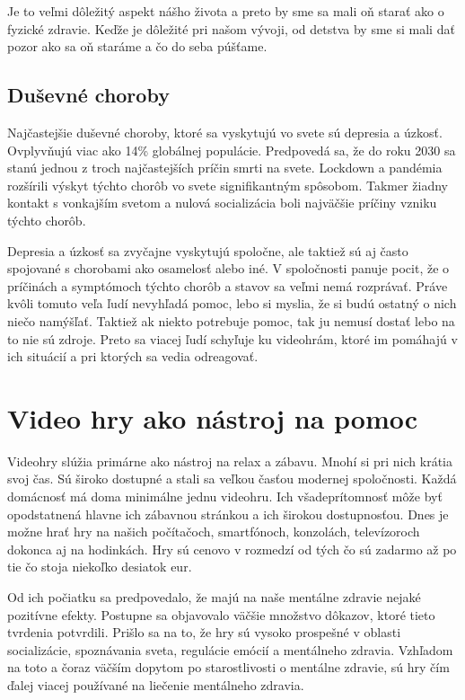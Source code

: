 \documentclass[10pt,oneside,slovak,a4paper]{article}
\begin{document}
Je to veľmi dôležitý aspekt nášho života a preto by sme sa mali oň starať ako o fyzické zdravie. Keďže je dôležité pri našom vývoji, od detstva by sme si mali dať pozor ako sa oň staráme a čo do seba púšťame. \cite{CDC}




\subsection{Duševné choroby} \label{Mentalne Zdravie- Choroby}

Najčastejšie duševné choroby, ktoré sa vyskytujú vo svete sú depresia a úzkosť.  Ovplyvňujú viac ako 14\% globálnej populácie. Predpovedá sa, že do roku 2030 sa stanú jednou z troch najčastejších príčin smrti na svete. Lockdown a pandémia rozšírili výskyt týchto chorôb vo svete signifikantným spôsobom. Takmer žiadny kontakt s vonkajším svetom a nulová socializácia boli najväčšie príčiny vzniku týchto chorôb. 

Depresia a úzkosť sa zvyčajne vyskytujú spoločne, ale taktiež sú aj často spojované s chorobami ako osamelosť alebo iné. V spoločnosti panuje pocit, že o príčinách a symptómoch týchto chorôb a stavov sa veľmi nemá rozprávať. Práve kvôli tomuto veľa ľudí nevyhľadá pomoc, lebo si myslia, že si budú ostatný o nich niečo namýšľať. Taktiež ak niekto potrebuje pomoc, tak ju nemusí dostať lebo na to nie sú zdroje. Preto sa viacej ľudí schyľuje ku videohrám, ktoré im pomáhajú v ich situácií a pri ktorých sa vedia odreagovať.\cite{Kowal:Mitigation}


\section{Video hry ako nástroj na pomoc} \label{Videohry}

Videohry slúžia primárne ako nástroj na relax a zábavu. Mnohí si pri nich krátia svoj čas. Sú široko dostupné a stali sa veľkou časťou modernej spoločnosti. Každá domácnosť má doma minimálne jednu videohru. Ich všadeprítomnosť môže byť opodstatnená hlavne ich zábavnou stránkou a ich širokou dostupnosťou. Dnes je možne hrať hry na našich počítačoch, smartfónoch, konzolách, televízoroch dokonca aj na hodinkách. Hry sú cenovo v rozmedzí od tých čo sú zadarmo až po tie čo stoja niekoľko desiatok eur.\cite{share}

	Od ich počiatku sa predpovedalo, že majú na naše mentálne zdravie nejaké pozitívne efekty. Postupne sa objavovalo väčšie množstvo dôkazov, ktoré tieto tvrdenia potvrdili. Prišlo sa na to, že hry sú vysoko prospešné v oblasti socializácie, spoznávania sveta, regulácie emócií a mentálneho zdravia. Vzhľadom na toto a čoraz väčším dopytom po starostlivosti o mentálne zdravie, sú hry čím ďalej viacej používané na liečenie mentálneho zdravia. \cite{Benefits}
\end{document}
